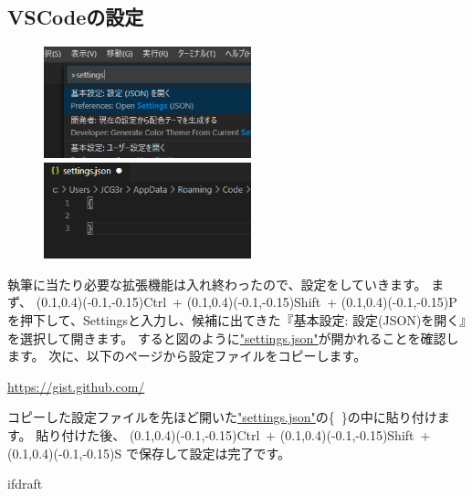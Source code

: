 		\subsection{VSCodeの設定}
			\begin{figure}
				\centering
				\includegraphics[width=60mm,trim=0 30 50 0,clip]{VSCode-setting-dialog.png}

				\vspace{2.5mm}
				
				\includegraphics[width=60mm]{VSCode-setting-json.png}
			\end{figure}
			執筆に当たり必要な拡張機能は入れ終わったので、設定をしていきます。
			まず、
			(0.1,0.4)(-0.1,-0.15)Ctrl~+
			(0.1,0.4)(-0.1,-0.15)Shift~+
			(0.1,0.4)(-0.1,-0.15)P
			を押下して、Settingsと入力し、候補に出てきた『基本設定: 設定(JSON)を開く』を選択して開きます。
			すると図のように\url{"settings.json"}が開かれることを確認します。
			次に、以下のページから設定ファイルをコピーします。
			\begin{mdframed}[style=shadow]
				\url{https://gist.github.com/}
			\end{mdframed}
			コピーした設定ファイルを先ほど開いた\url{"settings.json"}の\{~\}の中に貼り付けます。
			貼り付けた後、
			(0.1,0.4)(-0.1,-0.15)Ctrl~+
			(0.1,0.4)(-0.1,-0.15)Shift~+
			(0.1,0.4)(-0.1,-0.15)S
			で保存して設定は完了です。

			\expandafter\ifx\csname ifdraft\endcsname\relax

\fi
